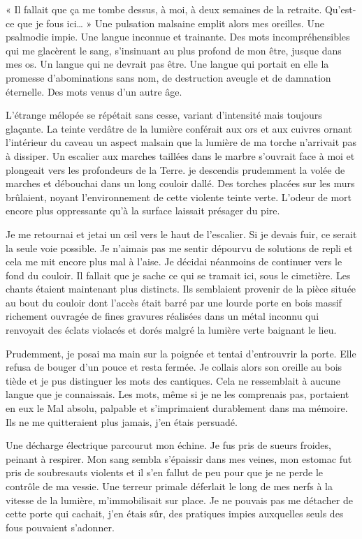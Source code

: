 « Il fallait que ça me tombe dessus, à moi, à deux semaines de la retraite. Qu'est-ce que je fous ici… » Une pulsation 
malsaine emplit alors mes oreilles. Une psalmodie impie. Une langue inconnue et trainante. Des mots incompréhensibles 
qui me glacèrent le sang, s'insinuant au plus profond de mon être, jusque dans mes os. Un langue qui ne devrait pas 
être. Une langue qui portait en elle la promesse d'abominations sans nom, de destruction aveugle et de damnation 
éternelle. Des mots venus d'un autre âge.

L'étrange mélopée se répétait sans cesse, variant d'intensité mais toujours glaçante. La teinte verdâtre de la 
lumière conférait aux ors et aux cuivres ornant l'intérieur du caveau un aspect malsain que la lumière de ma torche 
n'arrivait pas à dissiper. Un escalier aux marches taillées dans le marbre s'ouvrait face à moi et plongeait vers 
les profondeurs de la Terre. je descendis prudemment la volée de marches et débouchai dans un long couloir dallé. Des 
torches placées sur les murs brûlaient, noyant l'environnement de cette violente teinte verte. L'odeur de mort encore 
plus oppressante qu'à la surface laissait présager du pire.

Je me retournai et jetai un œil vers le haut de l'escalier. Si je devais fuir, ce serait la seule voie possible. Je 
n'aimais pas me sentir dépourvu de solutions de repli et cela me mit encore plus mal à l'aise. Je décidai néanmoins de 
continuer vers le fond du couloir. Il fallait que je sache ce qui se tramait ici, sous le cimetière. Les chants étaient 
maintenant plus distincts. Ils semblaient provenir de la pièce située au bout du couloir dont l'accès était barré par 
une lourde porte en bois massif richement ouvragée de fines gravures réalisées dans un métal inconnu qui renvoyait des 
éclats violacés et dorés malgré la lumière verte baignant le lieu.

Prudemment, je posai ma main sur la poignée et tentai d'entrouvrir la porte. Elle refusa de bouger d'un pouce et 
resta fermée. Je collais alors son oreille au bois tiède et je pus distinguer les mots des cantiques. Cela ne 
ressemblait à aucune langue que je connaissais. Les mots, même si je ne les comprenais pas, portaient en eux le Mal 
absolu, palpable et s'imprimaient durablement dans ma mémoire. Ils ne me quitteraient plus jamais, j'en étais persuadé.

Une décharge électrique parcourut mon échine. Je fus pris de sueurs froides, peinant à respirer. Mon sang sembla 
s'épaissir dans mes veines, mon estomac fut pris de soubresauts violents et il s'en fallut de peu pour que je ne perde 
le contrôle de ma vessie. Une terreur primale déferlait le long de mes nerfs à la vitesse de la lumière, m'immobilisait 
sur place. Je ne pouvais pas me détacher de cette porte qui cachait, j'en étais sûr, des pratiques impies auxquelles 
seuls des fous pouvaient s'adonner.

